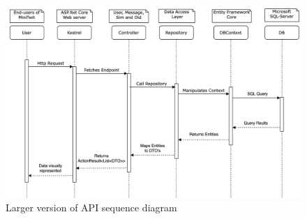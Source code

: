 \begin{figure}[H]
    \centering
    \includegraphics[angle=90, width=15.0cm]{Images/SequenceDevOps.jpg} 
    \caption{Larger version of API sequence diagram}
    \label{fig: Vertical Data Journey}
\end{figure}
\newpage

